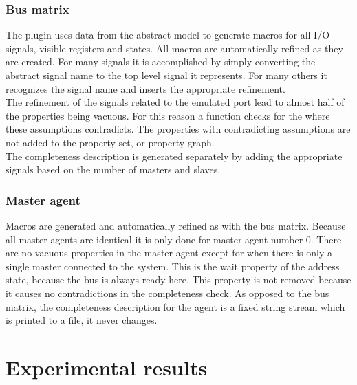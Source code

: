 \subsubsection{Bus matrix}
The plugin uses data from the abstract model to generate macros for all I/O signals, visible registers and states. All macros are automatically refined as they are created. For many signals it is accomplished by simply converting the abstract signal name to the top level signal it represents. For many others it recognizes the signal name and inserts the appropriate refinement. \\
The refinement of the signals related to the emulated port lead to almost half of the properties being vacuous. For this reason a function checks for the where these assumptions contradicts. The properties with contradicting assumptions are not added to the property set, or property graph. \\
The completeness description is generated separately by adding the appropriate signals based on the number of masters and slaves.

\subsubsection{Master agent}
Macros are generated and automatically refined as with the bus matrix. Because all master agents are identical it is only done for master agent number 0. There are no vacuous properties in the master agent except for when there is only a single master connected to the system. This is the wait property of the address state, because the bus is always ready here. This property is not removed because it causes no contradictions in the completeness check. As opposed to the bus matrix, the completeness description for the agent is a fixed string stream which is printed to a file, it never changes. 



\section{Experimental results}
\label{sec:results}





